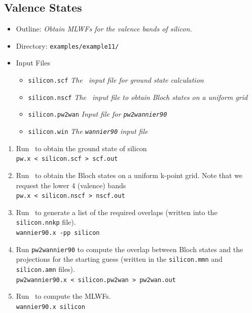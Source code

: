 \documentclass[a4paper,11pt,twoside]{article}
\begin{document}


\subsection*{Valence States}
\begin{itemize}
\item{Outline: \it{Obtain MLWFs for the valence bands of silicon.}}
\item{Directory: {\tt examples/example11/}}
\item{Input Files}
\begin{itemize}
\item{ {\tt silicon.scf}  {\it The \pwscf\ input file for ground state
    calculation}} 
\item{ {\tt silicon.nscf}  {\it The \pwscf\ input file to obtain Bloch
    states on a uniform grid}} 
\item{ {\tt silicon.pw2wan}  {\it Input file for {\tt pw2wannier90}}}
\item{ {\tt silicon.win}  {\it The {\tt wannier90} input file}}
\end{itemize}

\end{itemize}

\begin{enumerate}
\item Run \pwscf\ to obtain the ground state of silicon\\
{\tt pw.x < silicon.scf > scf.out}

\item Run \pwscf\ to obtain the Bloch states on a uniform k-point
  grid. Note that we request the lower 4 (valence) bands\\ 
{\tt pw.x < silicon.nscf > nscf.out}

\item Run \wannier\ to generate a list of the required overlaps (written
  into the {\tt silicon.nnkp} file).\\
{\tt wannier90.x -pp silicon}

\item Run {\tt pw2wannier90} to compute the overlap between Bloch
  states and the projections for the starting guess (written in the
  {\tt silicon.mmn} and {\tt  silicon.amn} files).\\
{\tt pw2wannier90.x < silicon.pw2wan > pw2wan.out}

\item Run \wannier\ to compute the MLWFs.\\
{\tt wannier90.x silicon}

\end{enumerate}
\end{document}
